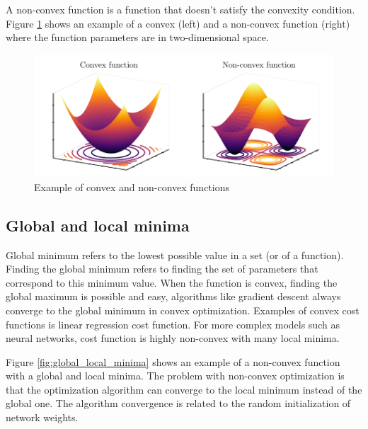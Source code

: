 A non-convex function is a function that doesn't satisfy the convexity condition. Figure \ref{fig:convex-nonconvex-functions} shows an example of a convex (left) and a non-convex function (right) where the function parameters are in two-dimensional space.

\begin{figure}[h]
    \centering
    \includegraphics{figures/gradient_descent.pdf}
    \caption{Example of convex and non-convex functions}
    \label{fig:convex-nonconvex-functions}
\end{figure}

\subsection{Global and local minima}
Global minimum refers to the lowest possible value in a set (or of a function). Finding the global minimum refers to finding the set of parameters that correspond to this minimum value. When the function is convex, finding the global maximum is possible and easy, algorithms like gradient descent always converge to the global minimum in convex optimization. Examples of convex cost functions is linear regression cost function. For more complex models such as neural networks, cost function is highly non-convex with many local minima.

Figure \ref{fig:global_local_minima} shows an example of a non-convex function with a global and local minima. The problem with non-convex optimization is that the optimization algorithm can converge to the local minimum instead of the global one. The algorithm convergence is related to the random initialization of network weights.


